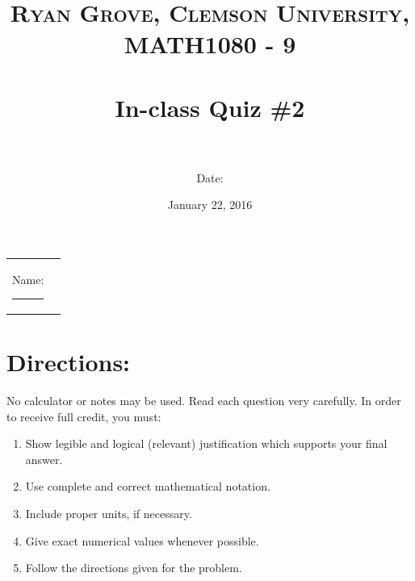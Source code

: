\documentclass[paper=a4, fontsize=11pt]{scrartcl} %
\title{	
\normalfont \normalsize 
\textsc{Ryan Grove, Clemson University, MATH1080 - 9} \\ [25pt] %
\horrule{0.5pt} \\[0.4cm] %
\huge In-class Quiz \#2 \\ %
\horrule{2pt} \\[0.5cm] %
}
\author{Date:} %
\date{\normalsize January 22, 2016} %
\numberwithin{equation}{section} %
\numberwithin{figure}{section} %
\numberwithin{table}{section} %
\begin{document}
\maketitle %

\begin{flushleft}
\begin{tabular}{l l}
Name: \rule{3.2in}{.01cm}  & {}%
\end{tabular}
\end{flushleft}


\section*{\textbf{Directions:}}

No calculator or notes may be used.  Read each question very carefully.  In order to receive full credit, you must:
\begin{enumerate}
\item Show legible and logical (relevant) justification which supports your final answer.
\item Use complete and correct mathematical notation.
\item Include proper units, if necessary.
\item Give exact numerical values whenever possible.
\item Follow the directions given for the problem.
\end{enumerate}
\vspace{.1in}

\newpage
\end{document}
